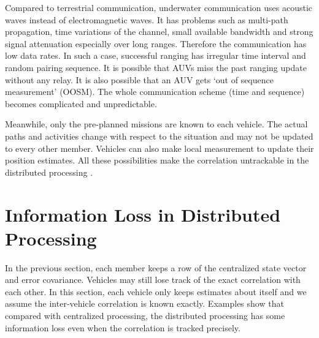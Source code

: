 Compared to terrestrial communication, underwater communication uses acoustic waves instead of electromagnetic waves. It has problems such as multi-path propagation, time variations of the channel, small available bandwidth and strong signal attenuation especially over long ranges. Therefore the communication has low data rates. In such a case, successful ranging has irregular time interval and random pairing sequence. It is possible that AUVs miss the past ranging update without any relay. It is also possible that an AUV gets `out of sequence measurement' (OOSM). The whole communication scheme (time and sequence) becomes complicated and unpredictable. 

Meanwhile, only the pre-planned missions are known to each vehicle. The actual paths and activities change with respect to the situation and may not be updated to every other member. Vehicles can also make local measurement to update their position estimates. All these possibilities make the correlation untrackable in the distributed processing .




\section{Information Loss in Distributed Processing}

In the previous section, each member keeps a row of the centralized state vector and error covariance. Vehicles may still lose track of the exact correlation with each other. In this section, each vehicle only keeps estimates about itself and we assume the inter-vehicle correlation is known exactly. Examples show that compared with centralized processing, the distributed processing has some information loss even when the correlation is tracked precisely.

